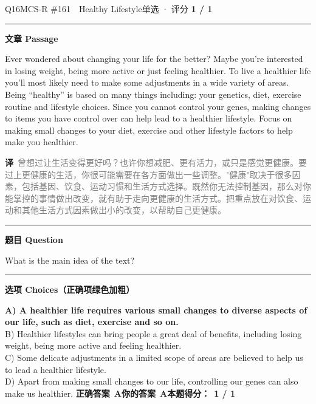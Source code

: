\documentclass[11pt]{article}
\newcommand{\ptesub}[1]{%
  \par\needspace{2\baselineskip}\smallskip
  {\color{cAccent}\rule[-0.2ex]{3pt}{1.05em}}\hspace{6pt}%
  {\bfseries\color{cHead}#1}\par\nopagebreak\smallskip}
\newcommand{\zh}[1]{{\footnotesize\textcolor{cNote}{\textbf{译}}\ \textcolor{gray}{#1}}}
\begin{document}
\begin{qblock}{Q16\quad MCS-R \#161\ \ Healthy Lifestyle}{单选 · 评分 \textcolor{cAccent}{\bfseries 1 / 1}}
\ptesub{文章 Passage}
\begin{promptbox}
Ever wondered about changing your life for the better? Maybe you're interested in losing weight, being more active or just feeling healthier. To live a healthier life you'll most likely need to make some adjustments in a wide variety of areas. Being ``healthy'' is based on many things including: your genetics, diet, exercise routine and lifestyle choices. Since you cannot control your genes, making changes to items you have control over can help lead to a healthier lifestyle. Focus on making small changes to your diet, exercise and other lifestyle factors to help make you healthier.
\end{promptbox}
\zh{曾想过让生活变得更好吗？也许你想减肥、更有活力，或只是感觉更健康。要过上更健康的生活，你很可能需要在各方面做出一些调整。"健康"取决于很多因素，包括基因、饮食、运动习惯和生活方式选择。既然你无法控制基因，那么对你能掌控的事情做出改变，就有助于走向更健康的生活方式。把重点放在对饮食、运动和其他生活方式因素做出小的改变，以帮助自己更健康。}
\ptesub{题目 Question}
\begin{notebox}What is the main idea of the text?\end{notebox}
\ptesub{选项 Choices（正确项绿色加粗）}
{\small
{\color{cFix}\textbf{A) A healthier life requires various small changes to diverse aspects of our life, such as diet, exercise and so on.}}\\
B) Healthier lifestyles can bring people a great deal of benefits, including losing weight, being more active and feeling healthier.\\
C) Some delicate adjustments in a limited scope of areas are believed to help us to lead a healthier lifestyle.\\
D) Apart from making small changes to our life, controlling our genes can also make us healthier.}
\smallskip
\textbf{正确答案}\ \textcolor{cFix}{\bfseries A}\qquad\textbf{你的答案}\ \textcolor{cFix}{\bfseries A}\qquad\textbf{本题得分：}\ {\color{cAccent}\bfseries 1 / 1}
\end{qblock}
\end{document}
